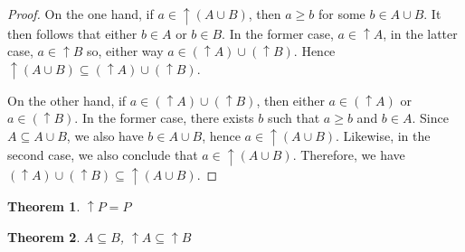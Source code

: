 \documentclass[12pt]{article}
\newcommand{\up}{\uparrow\!\!}
\newtheorem{theorem}{Theorem}
\begin{document}
\begin{proof}
On the one hand, if $a \in \up (A \cup B)$, then $a \ge b$ for
some $b \in A \cup B$.  It then follows that either $b \in A$
or $b \in B$.  In the former case, $a \in \up A$, in the latter
case, $a \in \up B$ so, either way $a \in (\up A) \cup (\up B)$.
Hence $\up (A \cup B) \subseteq (\up A) \cup (\up B)$.

On the other hand, if $a \in (\up A) \cup (\up B)$, then either
$a \in (\up A)$ or $a \in (\up B)$.  In the former case, there 
exists $b$ such that $a \ge b$ and $b \in A$.  Since $A \subseteq
A \cup B$, we also have $b \in A \cup B$, hence $a \in \up
(A \cup B)$.  Likewise, in the second case, we also conclude
that $a \in \up (A \cup B)$.  Therefore, we have 
$(\up A) \cup (\up B) \subseteq \up (A \cup B)$.
\end{proof}

\begin{theorem}
$\up P = P$
\end{theorem}

\begin{theorem}
$A\subseteq B$, $\up A\subseteq \up B$
\end{theorem}
\end{document}
